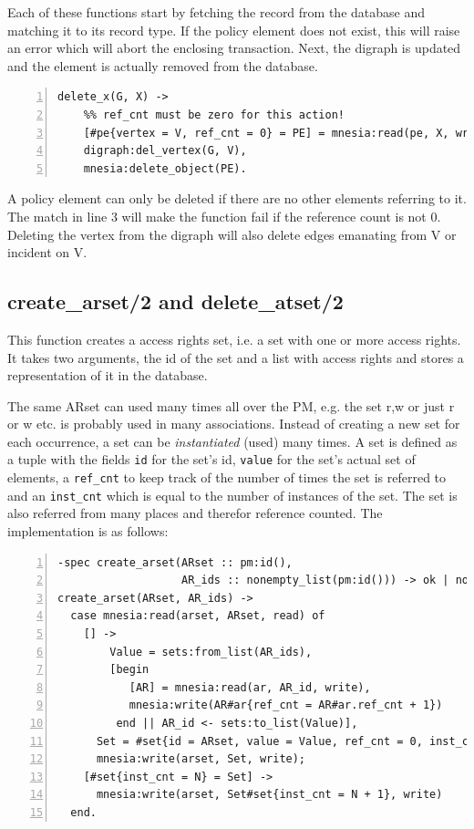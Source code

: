 \documentclass[12pt,a4paper,titlepage]{book}
\begin{document}
		Each of these functions start by fetching the record from the database and matching it to its record type. If the policy element does not exist, this will raise an error which will abort the enclosing transaction. Next, the digraph is updated and the element is actually removed from the database.
		
		\begin{lstlisting}[caption={delete\_x/2}, basicstyle=\footnotesize, breaklines=false, numbers=left]
delete_x(G, X) ->
    %% ref_cnt must be zero for this action!  
    [#pe{vertex = V, ref_cnt = 0} = PE] = mnesia:read(pe, X, write),
    digraph:del_vertex(G, V),
    mnesia:delete_object(PE). \end{lstlisting}
    
	    A policy element can only be deleted if there are no other elements referring to it. The match in line 3 will make the function fail if the reference count is not 0. Deleting the vertex from the digraph will also delete edges emanating from V or incident on V.

	\subsection{create\_arset/2 and delete\_atset/2}\label{create_ar_atset}
	
		This function creates a access rights set, i.e. a set with one or more access rights. It takes two arguments, the id of the set and a list with access rights and stores a representation of it in the database.
		
		The same ARset can used many times all over the PM, e.g. the set {r,w} or just {r} or {w} etc. is probably used in many associations. Instead of creating a new set for each occurrence, a set can be \emph{instantiated} (used) many times.  A set is defined as a tuple with the fields \lstinline|id| for the set's id, \lstinline|value| for the set's actual set of elements, a \lstinline|ref_cnt|  to keep track of the number of times the set is referred to and an \lstinline|inst_cnt| which is equal to the number of instances of the set. The set is also referred from many places and therefor reference counted. The implementation is as follows:
		
		\begin{lstlisting}[caption={create\_arset/2}, basicstyle=\footnotesize, breaklines=false, numbers=left]
-spec create_arset(ARset :: pm:id(),
                   AR_ids :: nonempty_list(pm:id())) -> ok | no_return().
create_arset(ARset, AR_ids) ->
  case mnesia:read(arset, ARset, read) of
    [] ->
	    Value = sets:from_list(AR_ids),
        [begin 
           [AR] = mnesia:read(ar, AR_id, write),
           mnesia:write(AR#ar{ref_cnt = AR#ar.ref_cnt + 1})
         end || AR_id <- sets:to_list(Value)],
      Set = #set{id = ARset, value = Value, ref_cnt = 0, inst_cnt = 1},
      mnesia:write(arset, Set, write);
    [#set{inst_cnt = N} = Set] ->
      mnesia:write(arset, Set#set{inst_cnt = N + 1}, write)
  end. \end{lstlisting}
	
\end{document}
